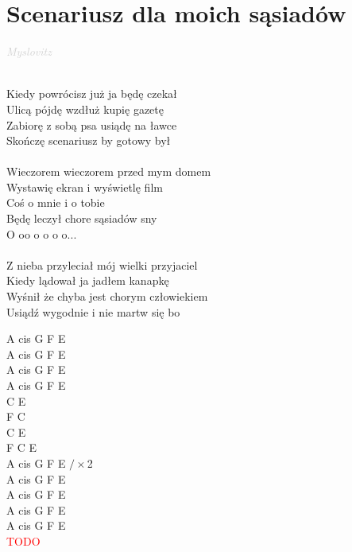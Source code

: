 \documentclass[a5paper, 10pt]{book}
\begin{document}
\section{Scenariusz dla moich sąsiadów}\textcolor{lightgray}{\textit{Myslovitz}}\\~\\
\begin{minipage}[t]{0.8\textwidth}
Kiedy powrócisz już ja będę czekał\\
Ulicą pójdę wzdłuż kupię gazetę\\
Zabiorę z sobą psa usiądę na ławce\\
Skończę scenariusz by gotowy był\\
\\
\hspace*{5mm}Wieczorem wieczorem przed mym domem\\
\hspace*{5mm}Wystawię ekran i wyświetlę film\\
\hspace*{5mm}Coś o mnie i o tobie\\
\hspace*{5mm}Będę leczył chore sąsiadów sny\\

\hspace*{8mm}O oo o o o o...\\
\\
Z nieba przyleciał mój wielki przyjaciel\\
Kiedy lądował ja jadłem kanapkę\\
Wyśnił że chyba jest chorym człowiekiem\\
Usiądź wygodnie i nie martw się bo\\
\end{minipage}
\begin{minipage}[t]{0.2\textwidth}
A cis G F E\\
A cis G F E\\
A cis G F E\\
A cis G F E\\

C E\\
F C\\
C E\\
F C E\\

A cis G F E $/ \times$2\\

A cis G F E\\
A cis G F E\\
A cis G F E\\
A cis G F E\\
\textcolor{red}{TODO}\\

\end{minipage}
\end{document}
